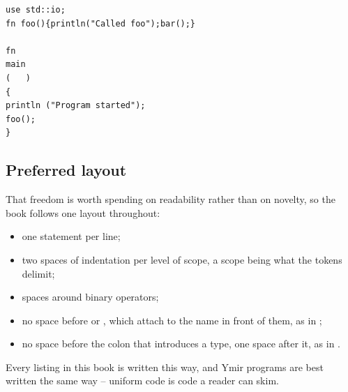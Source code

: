 \begin{lstlisting}[style=coloredverbatim, caption=Arbitrary code layout example]
use std::io;
fn foo(){println("Called foo");bar();}

fn
main
(   )
{
println ("Program started");
foo();
}
\end{lstlisting}

\subsection{Preferred layout}
\label{sec:basics:layout}

That freedom is worth spending on readability rather than on novelty, so the book
follows one layout throughout:

\begin{itemize}
\item one statement per line;
\item two spaces of indentation per level of scope, a scope being what the tokens
  \token{\{\}} delimit;
\item spaces around binary operators;
\item no space before \token{()} or \token{[]}, which attach to the name in front
  of them, as in ;
\item no space before the colon that introduces a type, one space after it, as in
  .
\end{itemize}

Every listing in this book is written this way, and Ymir programs are best
written the same way -- uniform code is code a reader can skim.

\vfill
\pagebreak
